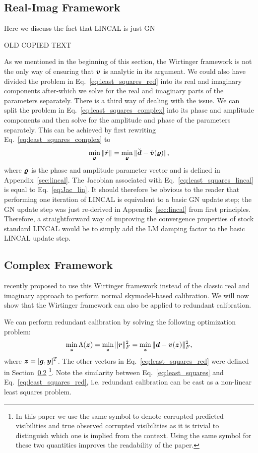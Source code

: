 \documentclass[useAMS,usenatbib]{mn2e}
\newcommand{\bz}{\bmath{z}}
\newcommand{\br}{\bmath{r}}
\newcommand{\bg}{\bmath{g}}
\newcommand{\bd}{\bmath{d}}
\newcommand{\bv}{\bmath{v}}
\newcommand{\by}{\bmath{y}}
\begin{document}
\subsection{Real-Imag Framework}
Here we discuss the fact that LINCAL is just GN

OLD COPIED TEXT

As we mentioned in the beginning of this section, the Wirtinger framework is not the only way of ensuring that $\bv$ is analytic in its argument. We could also 
have divided the problem in Eq.~\eqref{eq:least_squares_red} into its real and imaginary components after-which we solve for the real and imaginary parts of the parameters separately. There is a third way
of dealing with the issue. We can split the problem in Eq.~\eqref{eq:least_squares_complex} into its phase and amplitude components and then solve for the amplitude and phase of the parameters separately.
This can be achieved by first rewriting Eq.~\eqref{eq:least_squares_complex} to
\begin{equation}
\label{eq:least_squares_lincal}
\min_{\bmath{\varrho}} \|\breve{\br}\| = \min_{\bmath{\varrho}} \|\breve{\bd} - \breve{\bv}(\bmath{\varrho})\|, 
\end{equation}
where $\bmath{\varrho}$ is the phase and amplitude parameter vector and is defined in Appendix~\ref{sec:lincal}. The Jacobian associated with 
Eq.~\eqref{eq:least_squares_lincal} is equal to Eq.~\eqref{eq:Jac_lin}. It should therefore be obvious to the reader that 
performing one iteration of LINCAL is equivalent to a basic GN update step; the GN update step was just re-derived in Appendix~\ref{sec:lincal} from first principles.
Therefore, a straightforward way of improving the convergence properties of stock standard LINCAL would be to simply add the LM damping factor to the basic LINCAL update step. 


\subsection{Complex Framework}

\citet{Smirnov2015} recently proposed to use this Wirtinger framework instead of the classic real and imaginary approach to perform normal skymodel-based calibration. We will now show
that the Wirtinger framework can also be applied to redundant calibration.

We can perform redundant calibration by solving the following optimization problem: 
\begin{equation}
\label{eq:least_squares_red}
\min_{\bz} \Lambda(\bz) = \min_{\bz} \|\br\|_F^2 = \min_{\bz} \|\bd - \bv(\bz)\|_F^2, 
\end{equation}
where $\bz = [\bg,\by]^T$. The other vectors in Eq.~\eqref{eq:least_squares_red} were defined in Section~\ref{} \footnote{In this paper we use the same symbol to denote corrupted predicted visibilities and true observed corrupted visibilities as it
is trivial to distinguish which one is implied from the context. Using the same symbol for these two quantities improves the readability of the paper.}. Note the similarity between Eq.~\eqref{eq:least_squares} and Eq.~\eqref{eq:least_squares_red},
i.e. redundant calibration can be cast as a non-linear least squares problem. 
\end{document}

